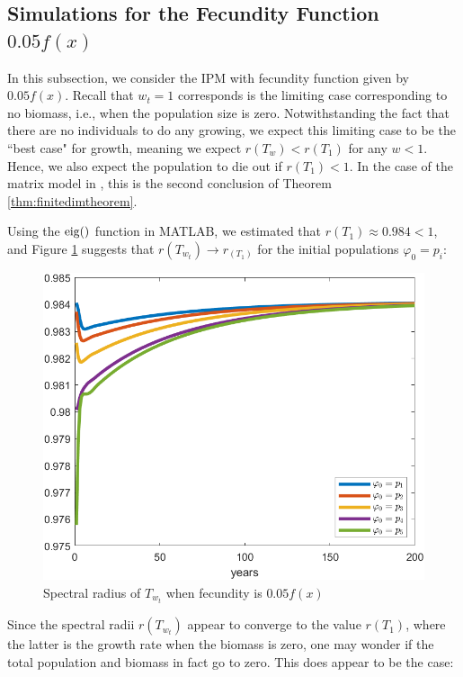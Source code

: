 \subsection{Simulations for the Fecundity Function $0.05f(x)$} \label{subsec:0.05f(x)}

In this subsection, we consider the IPM with fecundity function given by $0.05f(x)$. Recall that $w_t = 1$ corresponds is the limiting case corresponding to no biomass, i.e., when the population size is zero. Notwithstanding the fact that there are no individuals to do any growing, we expect this limiting case to be the ``best case" for growth, meaning we expect $r(T_w) < r(T_1)$ for any $w<1$. Hence, we also expect the population to die out if $r(T_1)<1$. In the case of the matrix model in \cite{Callahan2019}, this is the second conclusion of Theorem \ref{thm:finitedimtheorem}.

Using the $\operatorname{eig}()$ function in MATLAB, we estimated that $r(T_1) \approx 0.984 < 1$, and Figure \ref{fig:spectralradiuswhenf=0.05} suggests that $r(T_{w_t}) \to r_(T_1)$ for the initial populations $\varphi_0 = p_i$:

\begin{figure}[H]
	\centering
	\includegraphics[width=0.7\linewidth]{Images/F=0.05/spectral_radius_when_f=0.05}
	\caption{Spectral radius of $T_{w_t}$ when fecundity is $0.05f(x)$}
	\label{fig:spectralradiuswhenf=0.05}
\end{figure}

Since the spectral radii $r(T_{w_t})$ appear to converge to the value $r(T_1)$, where the latter is the growth rate when the biomass is zero, one may wonder if the total population and biomass in fact go to zero. This does appear to be the case:

